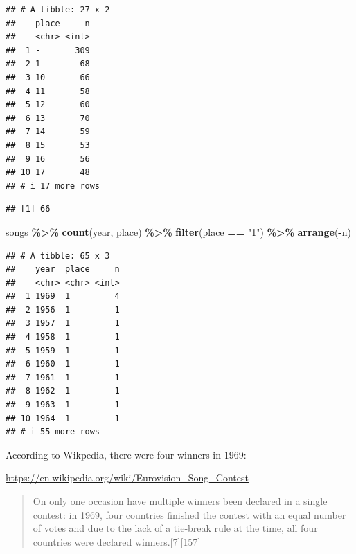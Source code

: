 \documentclass[
]{article}
\newenvironment{Shaded}{\begin{snugshade}}{\end{snugshade}}
\newcommand{\FunctionTok}[1]{\textcolor[rgb]{0.13,0.29,0.53}{\textbf{#1}}}
\newcommand{\NormalTok}[1]{#1}
\newcommand{\SpecialCharTok}[1]{\textcolor[rgb]{0.81,0.36,0.00}{\textbf{#1}}}
\newcommand{\StringTok}[1]{\textcolor[rgb]{0.31,0.60,0.02}{#1}}
\begin{document}
\begin{verbatim}
## # A tibble: 27 x 2
##    place     n
##    <chr> <int>
##  1 -       309
##  2 1        68
##  3 10       66
##  4 11       58
##  5 12       60
##  6 13       70
##  7 14       59
##  8 15       53
##  9 16       56
## 10 17       48
## # i 17 more rows
\end{verbatim}

\begin{Shaded}
\end{Shaded}

\begin{verbatim}
## [1] 66
\end{verbatim}

\begin{Shaded}
\begin{Highlighting}[]
\NormalTok{songs }\SpecialCharTok{\%\textgreater{}\%} 
  \FunctionTok{count}\NormalTok{(year, place) }\SpecialCharTok{\%\textgreater{}\%} 
  \FunctionTok{filter}\NormalTok{(place }\SpecialCharTok{==} \StringTok{"1"}\NormalTok{) }\SpecialCharTok{\%\textgreater{}\%} 
  \FunctionTok{arrange}\NormalTok{(}\SpecialCharTok{{-}}\NormalTok{n)}
\end{Highlighting}
\end{Shaded}

\begin{verbatim}
## # A tibble: 65 x 3
##    year  place     n
##    <chr> <chr> <int>
##  1 1969  1         4
##  2 1956  1         1
##  3 1957  1         1
##  4 1958  1         1
##  5 1959  1         1
##  6 1960  1         1
##  7 1961  1         1
##  8 1962  1         1
##  9 1963  1         1
## 10 1964  1         1
## # i 55 more rows
\end{verbatim}

According to Wikpedia, there were four winners in 1969:

\url{https://en.wikipedia.org/wiki/Eurovision_Song_Contest}

\begin{quote}
On only one occasion have multiple winners been declared in a single
contest: in 1969, four countries finished the contest with an equal
number of votes and due to the lack of a tie-break rule at the time, all
four countries were declared winners.{[}7{]}{[}157{]}
\end{quote}
\end{document}
